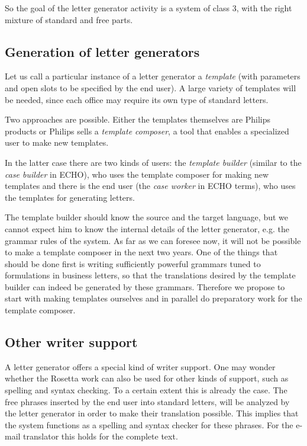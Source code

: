 So the goal of the letter generator activity
is a system of class 3, with the right mixture 
of standard and free parts.

\bigskip

\subsection{Generation of letter generators}

Let us call a particular instance of a letter generator a {\em template} (with 
parameters and open slots to be specified by the end user). A large variety of 
templates will be needed, 
since each office may require its own type of standard
letters. 

Two approaches are possible. Either the templates themselves 
are Philips products or Philips sells  a {\em 
template composer}, a tool that enables a specialized user to make
new templates.

In the latter case there are two kinds of users: 
 the {\em template builder} (similar to the {\em case builder} in ECHO), 
who uses the template 
composer for making new templates and there is
the end user (the {\em case worker} in ECHO terms), 
who uses the templates for generating letters.
 
The template builder 
should know the source and the target language,
but we cannot expect him to know the internal details of the letter generator,
e.g. the grammar rules of the system. As far as we can foresee 
now, it will 
not be possible to make a template composer in the next two years.
One of the things that should be done 
first is writing sufficiently 
powerful grammars tuned to formulations in business 
letters, so that the translations desired by the template builder 
can indeed be generated by these grammars. Therefore we propose to start with
making templates ourselves and in parallel do preparatory work 
for the template 
composer.


\subsection{Other writer support}

A letter generator offers a special kind of writer support. One may wonder 
whether the Rosetta work can also be used for other kinds of support, such as 
spelling and syntax checking. To a certain extent this is already the case.
The free phrases inserted by the end user into standard letters, will be 
analyzed by the letter generator 
in order to make their translation possible. This
implies that the system functions as a spelling and syntax checker for
these phrases. For the e-mail translator this holds for the complete text.

